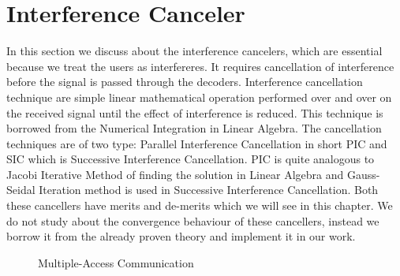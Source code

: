 \section{Interference Canceler}
In this section we discuss about the interference cancelers, which are essential because we treat the users as interfereres. It requires cancellation of interference before the signal is passed through the decoders. Interference cancellation technique are simple linear mathematical operation performed over and over on the received signal until the effect of interference is reduced. This technique is borrowed from the Numerical Integration in Linear Algebra. The cancellation techniques are of two type: Parallel Interference Cancellation in short PIC and SIC which is Successive Interference Cancellation. PIC is quite analogous to Jacobi Iterative Method of finding the solution in Linear Algebra and Gauss-Seidal Iteration method is used in Successive Interference Cancellation. Both these cancellers have merits and de-merits which we will see in this chapter. We do not study about the convergence behaviour of these cancellers, instead we borrow it from the already proven theory and implement it in our work.
\begin{figure}[htb]
  \centerline{  }
  \caption{Multiple-Access Communication}
\end{figure}
